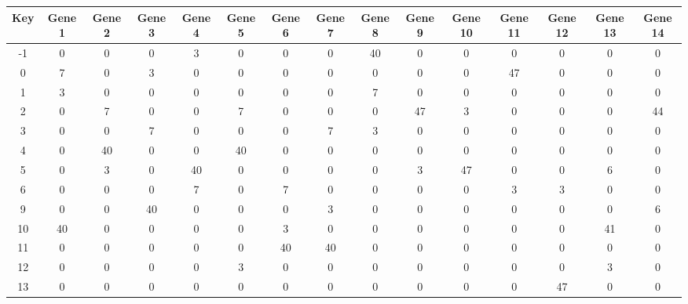 \begin{tabular}{|c|c|c|c|c|c|c|c|c|c|c|c|c|c|c|}
\hline
Key & Gene 1 & Gene 2 & Gene 3 & Gene 4 & Gene 5 & Gene 6 & Gene 7 & Gene 8 & Gene 9 & Gene 10 & Gene 11 & Gene 12 & Gene 13 & Gene 14 \\
\hline
-1 & 0 & 0 & 0 & 3 & 0 & 0 & 0 & 40 & 0 & 0 & 0 & 0 & 0 & 0 \\
0 & 7 & 0 & 3 & 0 & 0 & 0 & 0 & 0 & 0 & 0 & 47 & 0 & 0 & 0 \\
1 & 3 & 0 & 0 & 0 & 0 & 0 & 0 & 7 & 0 & 0 & 0 & 0 & 0 & 0 \\
2 & 0 & 7 & 0 & 0 & 7 & 0 & 0 & 0 & 47 & 3 & 0 & 0 & 0 & 44 \\
3 & 0 & 0 & 7 & 0 & 0 & 0 & 7 & 3 & 0 & 0 & 0 & 0 & 0 & 0 \\
4 & 0 & 40 & 0 & 0 & 40 & 0 & 0 & 0 & 0 & 0 & 0 & 0 & 0 & 0 \\
5 & 0 & 3 & 0 & 40 & 0 & 0 & 0 & 0 & 3 & 47 & 0 & 0 & 6 & 0 \\
6 & 0 & 0 & 0 & 7 & 0 & 7 & 0 & 0 & 0 & 0 & 3 & 3 & 0 & 0 \\
9 & 0 & 0 & 40 & 0 & 0 & 0 & 3 & 0 & 0 & 0 & 0 & 0 & 0 & 6 \\
10 & 40 & 0 & 0 & 0 & 0 & 3 & 0 & 0 & 0 & 0 & 0 & 0 & 41 & 0 \\
11 & 0 & 0 & 0 & 0 & 0 & 40 & 40 & 0 & 0 & 0 & 0 & 0 & 0 & 0 \\
12 & 0 & 0 & 0 & 0 & 3 & 0 & 0 & 0 & 0 & 0 & 0 & 0 & 3 & 0 \\
13 & 0 & 0 & 0 & 0 & 0 & 0 & 0 & 0 & 0 & 0 & 0 & 47 & 0 & 0 \\
\hline
\end{tabular}